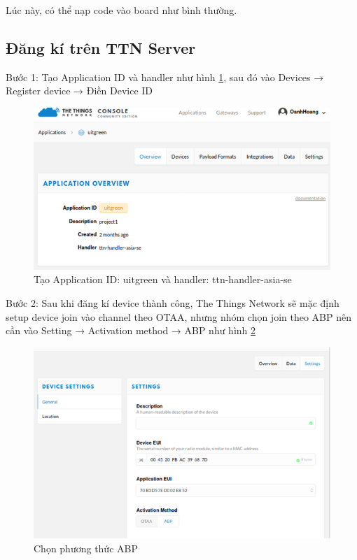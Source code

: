 Lúc này, có thể nạp code vào board như bình thường.

\subsection{Đăng kí trên TTN Server}
\begin{description}
    \item Bước 1: Tạo Application ID và handler như hình \ref{fig:create_application_id}, sau đó vào Devices → Register device → Điền Device ID
    \begin{figure}[H]
        \centering
        \includegraphics[width=\textwidth]{images/Quanh/Create_application_id.png}
        \caption{Tạo Application ID: uitgreen và handler: ttn-handler-asia-se}
        \label{fig:create_application_id}
    \end{figure}
    
    \item Bước 2: Sau khi đăng kí device thành công, The Things Network sẽ mặc định setup device join vào channel theo OTAA, nhưng nhóm chọn join theo ABP nên cần vào Setting → Activation method → ABP như hình \ref{fig:ABP_config}
    \begin{figure}[H]
        \centering
        \includegraphics[width=\textwidth]{images/Quanh/ABP_config.png}
        \caption{Chọn phương thức ABP}
        \label{fig:ABP_config}
    \end{figure}
\end{description}

